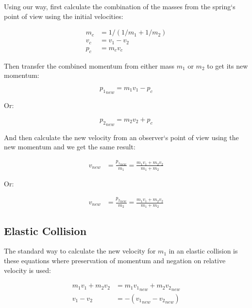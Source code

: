 \documentclass[]{elementary-physics}
\begin{document}
Using our way, first calculate the combination of the masses from the spring`s point of view using the initial velocities:

\begin{subequations}
\begin{align}
m_c &= 1/(1/m_1 + 1/m_2) \\
v_c &= v_1 - v_2 \\
p_c &= m_c v_c
\end{align}
\end{subequations}

Then transfer the combined momentum from either mass $m_1$ or $m_2$ to get its new momentum:

\begin{equation}
{p_1}_{new} = m_1 v_1 - p_c
\end{equation}

Or:

\begin{equation}
{p_2}_{new} = m_2 v_2 + p_c
\end{equation}

And then calculate the new velocity from an observer`s point of view using the new momentum and we get the same result:

\begin{subequations}
\begin{align}
{v}_{new} &= \frac{{p_1}_{new}}{m_1} = \frac{m_1 v_1 + m_2 v_2}{m_1 + m_2}
\end{align}
\end{subequations}

Or:

\begin{subequations}
\begin{align}
{v}_{new} &= \frac{{p_2}_{new}}{m_2} = \frac{m_1 v_1 + m_2 v_2}{m_1 + m_2}
\end{align}
\end{subequations}

\subsection{Elastic Collision}

The standard way to calculate the new velocity for $m_1$ in an elastic collision is these equations where preservation of momentum and negation on relative velocity is used:

\begin{subequations}
\begin{align}
m_1 v_1 + m_2 v_2 &= m_1 {v_1}_{new} + m_2 {v_2}_{new} \\
v_1 - v_2 &= -({v_1}_{new} - {v_2}_{new}) \\
\end{align}
\end{subequations}
\end{document}
